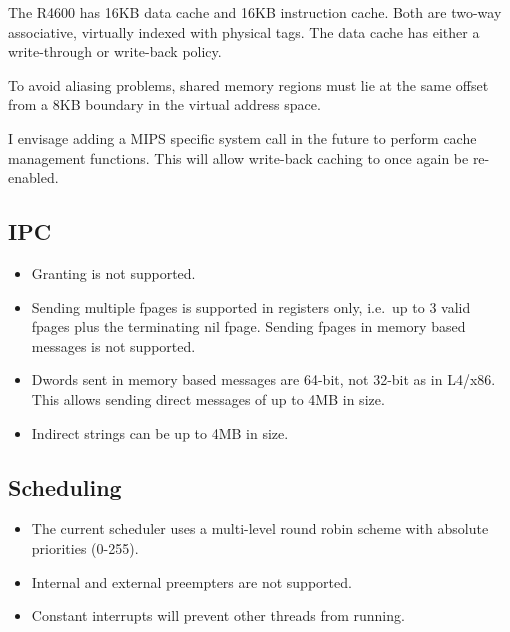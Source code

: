 \documentclass[a4paper,11pt,twoside,dvips]{book}
\begin{document}
The R4600 has 16KB data cache and 16KB instruction cache. Both are
two-way associative, virtually indexed with physical tags. The data
cache has either a write-through or write-back policy.

To avoid aliasing problems, shared memory regions must lie at the same
offset from a 8KB boundary in the virtual address space.


I envisage adding a MIPS specific system call in the future to perform
cache management functions. This will allow write-back caching to once
again be re-enabled.

\subsection{IPC}

\begin{itemize}
\item Granting is not supported.
\item Sending multiple fpages is supported in registers only, i.e.\ up to 3
  valid fpages plus the terminating nil fpage. Sending fpages in memory
  based messages is not supported.
\item Dwords sent in memory based messages are 64-bit, not 32-bit as in
  L4/x86. This allows sending direct messages of up to 4MB in size.
\item Indirect strings can be up to 4MB in size.
\end{itemize}

\subsection{Scheduling}

\begin{itemize}
 
\item \cbstart The current scheduler uses a multi-level round robin
  scheme with absolute priorities (0-255). \cbend
\item Internal and external preempters are not supported.
\item Constant interrupts will prevent other threads from running.
\end{itemize}
\end{document}

